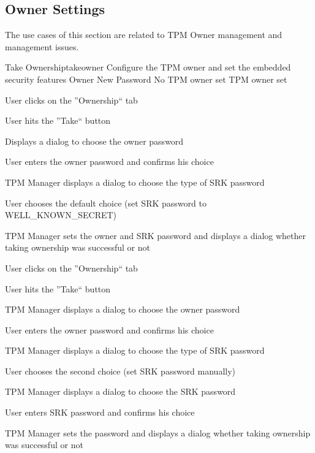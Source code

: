 \documentclass[
  american        %
]{sirrixreport}
\begin{document}
\subsection{Owner Settings}
The use cases of this section are related to TPM Owner management and \SRK management issues.

\begin{usecase}{Take Ownership}{takeowner}
\ucdesc Configure the TPM owner and set the embedded security features
\ucactors Owner
\ucinclude New Password
\ucprecond No TPM owner set
\ucpostcond TPM owner set
\ucnormal 
 \item User clicks on the ''Ownership`` tab
 \item User hits the ''Take`` button
 \item Displays a dialog to choose the owner password 
 \item User enters the owner password and confirms his choice
 \item TPM Manager displays a dialog to choose the type of SRK password 
 \item User chooses the default choice (set SRK password to WELL\_KNOWN\_SECRET) 
 \item TPM Manager sets the owner and SRK password and displays a dialog whether taking ownership was successful or not
\ucendflow 
\ucalternate
 \item User clicks on the ''Ownership`` tab
 \item User hits the ''Take`` button
 \item TPM Manager displays a dialog to choose the owner password 
 \item User enters the owner password and confirms his choice 
 \item TPM Manager displays a dialog to choose the type of SRK password 
 \item User chooses the second choice (set SRK password manually) 
 \item TPM Manager displays a dialog to choose the SRK password 
 \item User enters SRK password and confirms his choice 
 \item TPM Manager sets the password and displays a dialog whether taking ownership was successful or not
\ucendflow 
\end{usecase}
\clearpage
\end{document}
